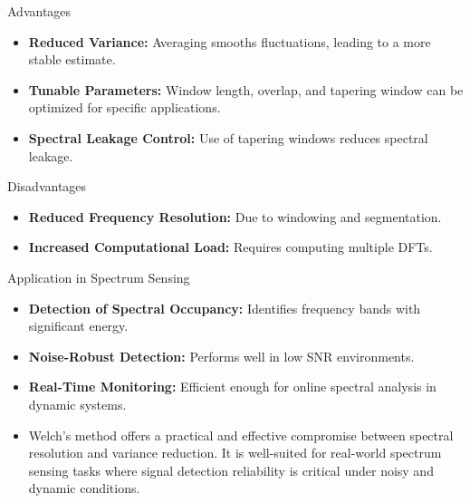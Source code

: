 \documentclass[10pt]{report}
\begin{document}
{Advantages}
\begin{itemize}
	\item \textbf{Reduced Variance:} Averaging smooths fluctuations, leading to a more stable estimate.
	\item \textbf{Tunable Parameters:} Window length, overlap, and tapering window can be optimized for specific applications.
	\item \textbf{Spectral Leakage Control:} Use of tapering windows reduces spectral leakage.
\end{itemize}
{Disadvantages}
\begin{itemize}
	\item \textbf{Reduced Frequency Resolution:} Due to windowing and segmentation.
	\item \textbf{Increased Computational Load:} Requires computing multiple DFTs.
\end{itemize}
{Application in Spectrum Sensing}
\begin{itemize}
	\item \textbf{Detection of Spectral Occupancy:} Identifies frequency bands with significant energy.
	\item \textbf{Noise-Robust Detection:} Performs well in low SNR environments.
	\item \textbf{Real-Time Monitoring:} Efficient enough for online spectral analysis in dynamic systems.
	\item Welch's method offers a practical and effective compromise between spectral resolution and variance reduction. It is well-suited for real-world spectrum sensing tasks where signal detection reliability is critical under noisy and dynamic conditions.
\end{itemize}
\end{document}
